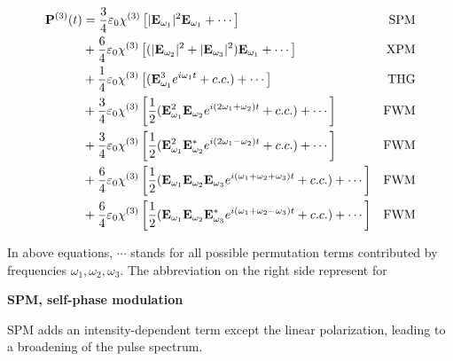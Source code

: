 \begin{align}
  \vb{P}^{(3)}(t) 
  & = \frac{3}{4} \varepsilon_0 \chi^{(3)} \left[| \vb{E}_{\omega_1} |^2 \vb{E}_{\omega_1} + \cdots\right] & \mathrm{SPM} \\
  & + \frac{6}{4} \varepsilon_0 \chi^{(3)} \left[(| \vb{E}_{\omega_2} |^2 + |\vb{E}_{\omega_3} |^2) \vb{E}_{\omega_1} + \cdots \right] & \mathrm{XPM} \\
  & + \frac{1}{4} \varepsilon_0 \chi^{(3)} \left[(\vb{E}_{\omega_1}^3 e^{i \omega_1 t} + c.c.) + \cdots\right] & \mathrm{THG} \\
  & + \frac{3}{4} \varepsilon_0 \chi^{(3)} \left[ \frac{1}{2} (\vb{E}_{\omega_1}^2 \vb{E}_{\omega_2} e^{i (2 \omega_1 + \omega_2) t} + c.c.) + \cdots \right] & \mathrm{FWM} \label{eq:fwm1} \\ 
  & + \frac{3}{4} \varepsilon_0 \chi^{(3)} \left[ \frac{1}{2} (\vb{E}_{\omega_1}^2 \vb{E}^{\ast}_{\omega_2} e^{i (2 \omega_1 - \omega_2) t} + c.c.) + \cdots \right] & \mathrm{FWM} \label{eq:fwm2} \\ 
  & + \frac{6}{4} \varepsilon_0 \chi^{(3)} \left[ \frac{1}{2} (\vb{E}_{\omega_1} \vb{E}_{\omega_2} \vb{E}_{\omega_3} e^{i (\omega_1 + \omega_2 + \omega_3) t} + c.c.) + \cdots \right] & \mathrm{FWM}  \label{eq:fwm3} \\
  & + \frac{6}{4} \varepsilon_0 \chi^{(3)} \left[ \frac{1}{2} (\vb{E}_{\omega_1} \vb{E}_{\omega_2} \vb{E}^{\ast}_{\omega_3} e^{i (\omega_1 + \omega_2 - \omega_3) t} + c.c.) + \cdots \right] & \mathrm{FWM} \label{eq:fwm4}
\end{align}

In above equations, $\cdots$ stands for all possible permutation terms contributed by frequencies $\omega_1, \omega_2, \omega_3$. The abbreviation on the right side represent for 

\bigskip
\noindent\textbf{SPM, self-phase modulation}

SPM adds an intensity-dependent term except the linear polarization, leading to a broadening of the pulse spectrum.

